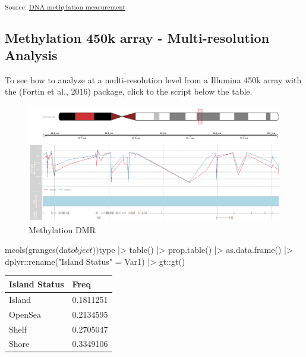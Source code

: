 \documentclass[
]{agujournal2019}
\newenvironment{Shaded}{\begin{snugshade}}{\end{snugshade}}
\newcommand{\ImportTok}[1]{\textcolor[rgb]{0.00,0.46,0.62}{#1}}
\newcommand{\NormalTok}[1]{\textcolor[rgb]{0.00,0.23,0.31}{#1}}
\newcommand{\OperatorTok}[1]{\textcolor[rgb]{0.37,0.37,0.37}{#1}}
\newcommand{\StringTok}[1]{\textcolor[rgb]{0.13,0.47,0.30}{#1}}
\begin{document}
\textsubscript{Source:
\href{https://pipaber.github.io/Epigenomics/notebooks/Methylation_analysis-preview.html\#cell-fig-meth}{DNA
methylation measurement}}

\subsection{Methylation 450k array - Multi-resolution
Analysis}\label{methylation-450k-array---multi-resolution-analysis}

To see how to analyze at a multi-resolution level from a Illumina 450k
array with the (Fortin et al., 2016) package, click to the script below
the table.

\begin{figure}[H]

{\centering \includegraphics{notebooks/track_plot.png}

}

\caption{Methylation DMR}

\end{figure}%

\begin{Shaded}
\begin{Highlighting}[]
\NormalTok{mcols(granges(dat$object))$type }\OperatorTok{|\textgreater{}} 
\NormalTok{    table() }\OperatorTok{|\textgreater{}} 
\NormalTok{    prop.table() }\OperatorTok{|\textgreater{}} 
    \ImportTok{as}\NormalTok{.data.frame() }\OperatorTok{|\textgreater{}} 
\NormalTok{    dplyr::rename(}\StringTok{"Island Status"} \OperatorTok{=}\NormalTok{ Var1) }\OperatorTok{|\textgreater{}} 
\NormalTok{    gt::gt()}
\end{Highlighting}
\end{Shaded}

\label{island-status}
\begin{longtable}[]{@{}ll@{}}
\toprule\noalign{}
Island Status & Freq \\
\midrule\noalign{}
\endhead
\bottomrule\noalign{}
\endlastfoot
Island & 0.1811251 \\
OpenSea & 0.2134595 \\
Shelf & 0.2705047 \\
Shore & 0.3349106 \\
\end{longtable}
\end{document}
